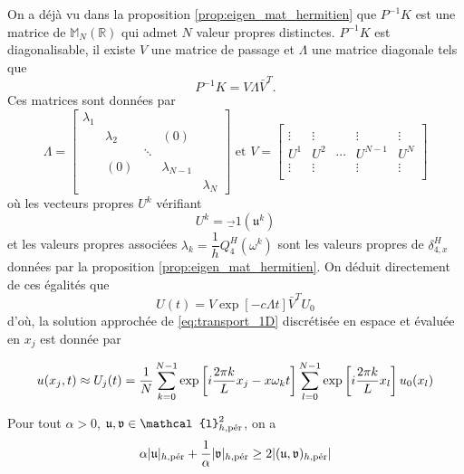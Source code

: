On a déjà vu dans la proposition \ref{prop:eigen_mat_hermitien} que $P^{-1}K$ est une matrice de $\mathbb{M}_N(\mathbb{R})$ qui admet $N$ valeur propres distinctes. $P^{-1}K$ est diagonalisable, il existe $V$ une matrice de passage et $\Lambda$ une matrice diagonale tels que 
\begin{equation}
P^{-1}K = V \Lambda \bar{V}^T.
\end{equation}
Ces matrices sont données par 
\begin{equation}
\Lambda = \begin{bmatrix}
\lambda_1 &   &   &   &   \\ 
  & \lambda_2 &   & (0) &   \\ 
  &   & \ddots &   &   \\ 
  & (0) &   & \lambda_{N-1} &   \\ 
  &   &   &   & \lambda_N
\end{bmatrix} \text{ et }
V = \begin{bmatrix}
  &   &   &   &   \\ 
\vdots & \vdots  &   & \vdots  & \vdots  \\ 
U^1 & U^2 & \cdots & U^{N-1} & U^N \\ 
\vdots &\vdots &  &\vdots &\vdots \\ 
  &   &   &   &  
\end{bmatrix} 
\label{eq:matrice_diagonalisation}
\end{equation}
où les vecteurs propres $U^k$ vérifiant
\begin{equation}
U^k = \vec_1 ( \mathfrak{u}^k )
\end{equation} 
et les valeurs propres associées $\lambda_k = \dfrac{1}{h}Q_{4}^H(\omega^k)$ sont les valeurs propres de $\delta_{4,x}^H$ données par la proposition \ref{prop:eigen_mat_hermitien}. On déduit directement de ces égalités que 
\begin{equation}
U(t) = V \exp \left[-c \Lambda t \right] \bar{V}^T U_0
\end{equation}
d'où, la solution approchée de \eqref{eq:transport_1D} discrétisée en espace et évaluée en $x_j$ est donnée par 

\begin{equation}
u(x_j, t) \approx U_j ( t ) = \dfrac{1}{N} \gsum_{k=0}^{N-1}  \exp \left[ i \dfrac{2 \pi k}{L} x_j - x \omega_k t \right] \gsum_{l=0}^{N-1} \exp \left[ i \dfrac{2 \pi k}{L} x_l \right] u_0 (x_l)
\end{equation}




\begin{lemme}
Pour tout $\alpha > 0$, $\mathfrak{u}, \mathfrak{v} \in \mathcal{l}^2_{h,\per}$, on a
\begin{equation}
\alpha |\mathfrak{u}|_{h,\per} + \dfrac{1}{\alpha} |\mathfrak{v}|_{h,\per} \geq 2 |(\mathfrak{u},\mathfrak{v})_{h,\per}|
\end{equation}
\label{lem:ineg_1}
\end{lemme}

